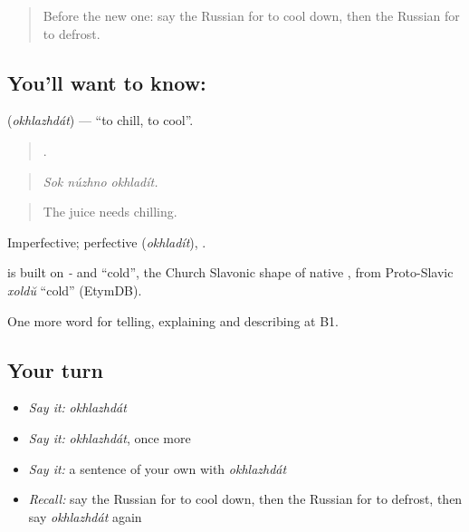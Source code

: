 \label{lesson:RU-C335-okhlazhdat}



\begin{quote}
Before the new one: say the Russian for to cool down, then the Russian for to defrost.
\end{quote}

\subsection*{You'll want to know: }
\textbf{} (\emph{okhlazhdát}) — \textquotedblleft{}to chill, to cool\textquotedblright{}.

\begin{quote}
  .
\end{quote}

\begin{quote}
\emph{Sok núzhno okhladít.}
\end{quote}

\begin{quote}
The juice needs chilling.
\end{quote}

Imperfective; perfective \emph{} (\emph{okhladít}), \emph{}.

\begin{cousinweb}
\emph{} is built on \emph{-} and \emph{} \textquotedblleft{}cold\textquotedblright{}, the Church Slavonic shape of native \emph{}, from Proto-Slavic \emph{xoldŭ} \textquotedblleft{}cold\textquotedblright{} (EtymDB).
\end{cousinweb}

\begin{grammarlens}[title={What you've built}]
One more word for telling, explaining and describing at B1.
\end{grammarlens}

\subsection*{Your turn}
\begin{itemize}
\raggedright
  \item \emph{Say it:} \emph{okhlazhdát}
  \item \emph{Say it:} \emph{okhlazhdát}, once more
  \item \emph{Say it:} a sentence of your own with \emph{okhlazhdát}
  \item \emph{Recall:} say the Russian for to cool down, then the Russian for to defrost, then say \emph{okhlazhdát} again
\end{itemize}

